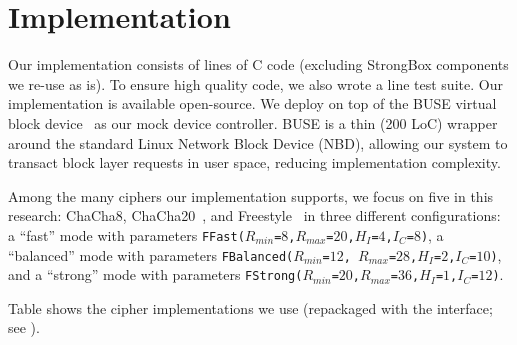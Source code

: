 \section{Implementation}\label{subsec:implementation}

Our \sys implementation consists of \locTotal lines of C code (excluding
StrongBox components we re-use as is). To ensure high quality code, we also
wrote a \locTest line test suite. Our implementation is available open-source.
We deploy \sys on top of the BUSE virtual block device~\cite{BUSE} as our mock
device controller. BUSE is a thin (200 LoC) wrapper around the standard Linux
Network Block Device (NBD), allowing our system to transact block layer requests
in user space, reducing implementation complexity.



Among the many ciphers our implementation supports, we focus on five in this
research: ChaCha8, ChaCha20~\cite{ChaCha20}, and Freestyle~\cite{Freestyle} in
three different configurations: a ``fast'' mode with parameters
\texttt{FFast($R_{min}$=$8$,$R_{max}$=$20$,$H_I$=$4$,$I_C$=$8$)}, a ``balanced''
mode with parameters \texttt{FBalanced($R_{min}$=$12$,
$R_{max}$=$28$,$H_I$=$2$,$I_C$=$10$)}, and a ``strong'' mode with parameters
\texttt{FStrong($R_{min}$=$20$,$R_{max}$=$36$,$H_I$=$1$,$I_C$=$12$)}.

Table  shows the cipher implementations we use (repackaged with the
\sysB interface; see ).

